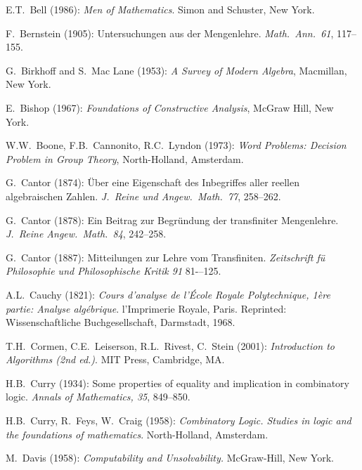 
\begin{thebibliography}{999}




E.T.~Bell (1986):
{\it Men of Mathematics}.
Simon and Schuster, New York.

F.~Bernstein (1905): Untersuchungen aus der Mengenlehre. {\it
Math.~Ann.~61}, 117--155.

G.~Birkhoff and S.~Mac Lane (1953): {\it A Survey of Modern Algebra},
Macmillan, New York.

E.~Bishop (1967): {\it Foundations of Constructive Analysis},
McGraw Hill, New York.

W.W.~Boone, F.B.~Cannonito, R.C.~Lyndon (1973):
{\it Word Problems: Decision Problem in Group Theory}, North-Holland,
Amsterdam.


G.~Cantor (1874): \"{U}ber eine Eigenschaft des Inbegriffes aller
reellen algebraischen Zahlen.  {\it J.~Reine und Angew.~Math.~77},
258--262.

G.~Cantor (1878): Ein Beitrag zur Begr\"{u}ndung der transfiniter
Mengenlehre.  {\it J.~Reine Angew.~Math.~84}, 242--258.

G.~Cantor (1887): Mitteilungen zur Lehre vom Transfiniten.
{\it Zeitschrift f\"{u} Philosophie und Philosophische Kritik 91}
81-–125.

A.L.~Cauchy (1821): {\it Cours d'analyse de l'\'{E}cole Royale
Polytechnique, 1\`{e}re partie: Analyse alg\'{e}brique}.
l'Imprimerie Royale, Paris.  Reprinted: Wissenschaftliche
Buchgesellschaft, Darmstadt, 1968.

T.H.~Cormen, C.E.~Leiserson, R.L.~Rivest, C.~Stein (2001):
{\it Introduction to Algorithms (2nd ed.)}.
MIT Press, Cambridge, MA.

H.B.~Curry (1934): Some properties of equality and implication in
combinatory logic.  {\it Annals of Mathematics, 35}, 849--850.

H.B.~Curry, R.~Feys, W.~Craig (1958):
{\it Combinatory Logic.  Studies in logic and the foundations of
mathematics}.  North-Holland, Amsterdam.


M.~Davis (1958):
{\it Computability and Unsolvability.}
McGraw-Hill, New York.


\end{thebibliography}
